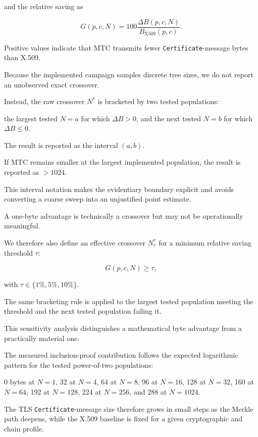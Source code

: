 \documentclass[journal]{IEEEtran}
\begin{document}
and the relative saving as

\begin{equation}
G(p,c,N)=100\frac{\Delta B(p,c,N)}{B_{\mathrm{X509}}(p,c)}.
\end{equation}

Positive values indicate that MTC transmits fewer \texttt{Certificate}-message bytes than X.509.



Because the implemented campaign samples discrete tree sizes, we do not report an unobserved exact crossover.

Instead, the raw crossover $N^*$ is bracketed by two tested populations:

the largest tested $N=a$ for which $\Delta B>0$, and the next tested $N=b$ for which $\Delta B\le 0$.

The result is reported as the interval $(a,b)$.

If MTC remains smaller at the largest implemented population, the result is reported as $>1024$.

This interval notation makes the evidentiary boundary explicit and avoids converting a coarse sweep into an unjustified point estimate.



A one-byte advantage is technically a crossover but may not be operationally meaningful.

We therefore also define an effective crossover $N^*_{\tau}$ for a minimum relative saving threshold $\tau$:

\begin{equation}
G(p,c,N)\ge\tau,
\end{equation}

with $\tau\in\{1\%,5\%,10\%\}$.

The same bracketing rule is applied to the largest tested population meeting the threshold and the next tested population failing it.

This sensitivity analysis distinguishes a mathematical byte advantage from a practically material one.



The measured inclusion-proof contribution follows the expected logarithmic pattern for the tested power-of-two populations:

0 bytes at $N=1$, 32 at $N=4$, 64 at $N=8$, 96 at $N=16$, 128 at $N=32$, 160 at $N=64$, 192 at $N=128$, 224 at $N=256$, and 288 at $N=1024$.

The TLS \texttt{Certificate}-message size therefore grows in small steps as the Merkle path deepens, while the X.509 baseline is fixed for a given cryptographic and chain profile.
\end{document}
